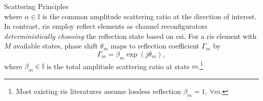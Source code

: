 \documentclass[journal]{IEEEtran}
\begin{document}
\begin{section}{Scattering Principles}
\begin{equation}
	\end{equation}
	where $\alpha \in \mathbb{I}$ is the common amplitude scattering ratio at the direction of interest.
	In contrast, \gls{ris} employ reflect elements as channel reconfigurators \emph{deterministically choosing} the reflection state based on \gls{csi}.
	For a \gls{ris} element with $M$ available states, phase shift $\theta_m$ maps to reflection coefficient $\Gamma_m$ by \cite{Wu2018}
	\begin{equation}
		\Gamma_m = \beta_m \exp(j \theta_m),
		\label{eq:passive_beamforming}
	\end{equation}
	where $\beta_m \in \mathbb{I}$ is the total amplitude scattering ratio at state $m$.\footnote{Most existing \gls{ris} literatures assume lossless reflection $\beta_m=1$, $\forall m$.}
\end{section}
\end{document}
